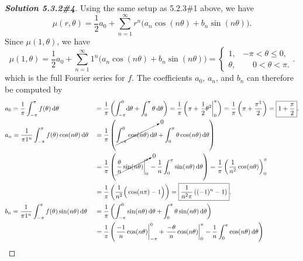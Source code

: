 \documentclass[letterpaper,11pt]{article} %
\theoremstyle{plain}
\begin{document}
\begin{proof}[\textbf{Solution 5.3.2\#4}] %
    Using the same setup as 5.2.3\#1 above, we have
    \begin{equation*}
    \mu(r, \theta) = \frac{1}{2} a_0 + \sum_{n=1}^\infty r^n \Big(a_n \cos(n\theta) + b_n \sin(n\theta) \Big).
    \end{equation*}
     Since $\mu(1, \theta)$, we have
    \begin{equation*}
    \mu(1, \theta) = \frac{1}{2} a_0 + \sum_{n=1}^\infty 1^n \Big(a_n \cos(n\theta) + b_n \sin(n\theta) \Big) =\begin{cases} 1, & -\pi < \theta \leq 0, \\ \theta, & \phantom{-}0 < \theta < \pi. \end{cases}.
    \end{equation*}
     which is the full Fourier series for $f$. The coefficients $a_0$, $a_n$, and $b_n$ can therefore be computed by
     \begin{align*}
        &a_0 = \frac{1}{\pi} \int_{-\pi}^\pi f(\theta)\, \mathrm{d}\theta& &=\frac{1}{\pi}\left( \int_{-\pi}^0\!\mathrm{d}\theta + \int_0^\pi \theta \,\mathrm{d}\theta \right)= \frac{1}{\pi}\left(\pi + \left.\frac{1}{2} \theta^2 \right|_0^\pi \right)= \frac{1}{\pi}\left(\pi + \frac{\pi^2}{2}\right) = \boxed{1 + \frac{\pi}{2}}.\\
        &a_n = \frac{1}{\pi 1^n} \int_{-\pi}^{\pi} f(\theta) \cos(n\theta)\,\mathrm{d}\theta& &= \frac{1}{\pi} \left( \cancelto{0}{\int_{-\pi}^0 \cos(n\theta) \,\mathrm{d}\theta} + \int_0^\pi \theta\cos(n\theta) \, \mathrm{d}\theta\right) \\ &&&= \frac{1}{\pi}\left(\cancelto{0}{\left.\frac{\theta}{n} \sin (n\theta) \right|_0^\pi} - \frac{1}{n}\int_0^\pi \sin (n\theta) \,\mathrm{d}\theta\right) = \frac{1}{\pi} \left( \frac{1}{n^2} \cos(n\theta)\right)_0^\pi \\
        &&&= \frac{1}{\pi}\left(\frac{1}{n^2} \Big(\cos(n\pi) - 1\Big)\right) = \boxed{\frac{1}{n^2 \pi}\left((-1)^n -1 \right)}.\\
        &b_n = \frac{1}{\pi 1^n} \int_{-\pi}^{\pi} f(\theta) \sin(n\theta)\,\mathrm{d}\theta& &= \frac{1}{\pi} \left(\int_{-\pi}^0 \sin(n\theta) \,\mathrm{d}\theta + \int_0^\pi \theta\sin(n\theta) \, \mathrm{d}\theta\right) \\
        &&&=\frac{1}{\pi} \left( \left.\frac{-1}{n} \cos(n \theta)\right|_{-\pi}^0 + \left.\frac{-\theta}{n}\cos(n\theta)\right|_0^\pi - \frac{1}{n} \int_0^\pi \cos(n\theta)\,\mathrm{d}\theta\right) \\

\end{align*}
\end{proof}
\end{document}
